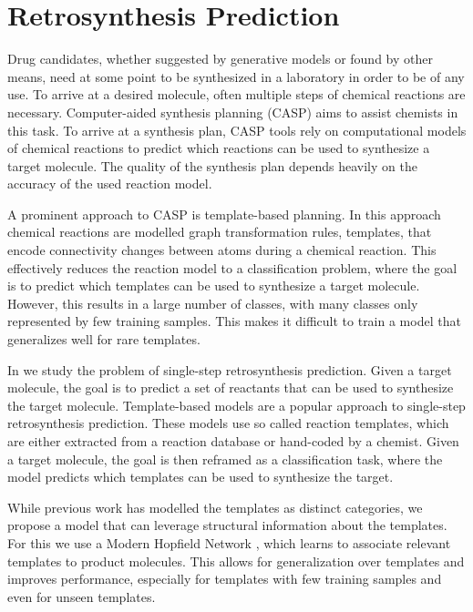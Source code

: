 \section{Retrosynthesis Prediction}
Drug candidates, whether suggested by generative models or found by other means,
need at some point to be synthesized in a laboratory in order to be of any use.
To arrive at a desired molecule, often multiple steps of chemical reactions are
necessary. Computer-aided synthesis planning (CASP) aims to assist chemists in
this task. To arrive at a synthesis plan, CASP tools rely on computational
models of chemical reactions to predict which reactions can be used to
synthesize a target molecule. The quality of the synthesis plan depends heavily
on the accuracy of the used reaction model.

A prominent approach to CASP is template-based planning. In this approach
chemical reactions are modelled graph transformation rules, templates, that
encode connectivity changes between atoms during a chemical reaction.
This effectively reduces the reaction model to a classification problem, where
the goal is to predict which templates can be used to synthesize a target molecule.
However, this results in a large number of classes, with many classes only
represented by few training samples. This makes it difficult to train a model
that generalizes well for rare templates.

In \citep{seidlImprovingFewZeroShot2022} we study the problem of single-step
retrosynthesis prediction. Given a target molecule, the goal is to predict a
set of reactants that can be used to synthesize the target molecule.
Template-based models are a popular approach to single-step retrosynthesis
prediction. These models use so called reaction templates, which are
either extracted from a reaction database or hand-coded by a chemist.
Given a target molecule, the goal is then reframed as a classification task,
where the model predicts which templates can be used to synthesize the target.

While previous work has modelled the templates as distinct categories, we
propose a model that can leverage structural information about the templates.
For this we use a Modern Hopfield Network \citep{ramsauerHopfieldNetworksAll2020}, which
learns to associate relevant templates to product molecules.
This allows for generalization over templates and improves performance, especially
for templates with few training samples and even for unseen templates.

